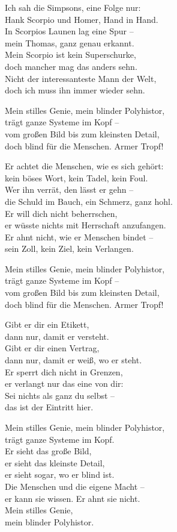\begin{lyrics}
Ich sah die Simpsons, eine Folge nur:\\
Hank Scorpio und Homer, Hand in Hand.\\
In Scorpios Launen lag eine Spur –\\
mein Thomas, ganz genau erkannt.\\
Mein Scorpio ist kein Superschurke,\\
doch mancher mag das anders sehn.\\
Nicht der interessanteste Mann der Welt,\\
doch ich muss ihn immer wieder sehn.

Mein stilles Genie, mein blinder Polyhistor,\\
trägt ganze Systeme im Kopf –\\
vom großen Bild bis zum kleinsten Detail,\\
doch blind für die Menschen. Armer Tropf!

Er achtet die Menschen, wie es sich gehört:\\
kein böses Wort, kein Tadel, kein Foul.\\
Wer ihn verrät, den lässt er gehn –\\
die Schuld im Bauch, ein Schmerz, ganz hohl.\\
Er will dich nicht beherrschen,\\
er wüsste nichts mit Herrschaft anzufangen.\\
Er ahnt nicht, wie er Menschen bindet –\\
sein Zoll, kein Ziel, kein Verlangen.

Mein stilles Genie, mein blinder Polyhistor,\\
trägt ganze Systeme im Kopf –\\
vom großen Bild bis zum kleinsten Detail,\\
doch blind für die Menschen. Armer Tropf!

Gibt er dir ein Etikett,\\
dann nur, damit er versteht.\\
Gibt er dir einen Vertrag,\\
dann nur, damit er weiß, wo er steht.\\
Er sperrt dich nicht in Grenzen,\\
er verlangt nur das eine von dir:\\
Sei nichts als ganz du selbst –\\
das ist der Eintritt hier.

Mein stilles Genie, mein blinder Polyhistor,\\
trägt ganze Systeme im Kopf.\\
Er sieht das große Bild,\\
er sieht das kleinste Detail,\\
er sieht sogar, wo er blind ist.\\
Die Menschen und die eigene Macht –\\
er kann sie wissen. Er ahnt sie nicht.\\
Mein stilles Genie,\\
mein blinder Polyhistor.
\end{lyrics}

